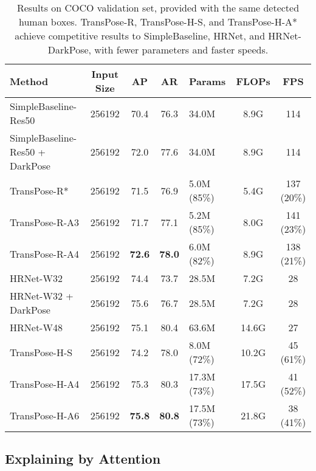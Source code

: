 \documentclass{article}
\begin{document}
\begin{table*}\small
 	\begin{center}
 		\setlength{\tabcolsep}{0.4mm}
 		\renewcommand{\arraystretch}{1.1}
 		\begin{tabular}{l|c|cc|l|c|c}
 			\toprule
 			Method &Input Size &AP &AR &Params &FLOPs & FPS \\
 			\midrule
 			SimpleBaseline-Res50~\cite{xiao2018simple} &256192 &70.4& 76.3 &34.0M &8.9G & 114\\
 			SimpleBaseline-Res50 + DarkPose &256192 &72.0& 77.6 &34.0M &8.9G & 114\\
 			\hline
 			TransPose-R* & 256192 & 71.5 & 76.9& 5.0M ({\color{black}85\%}) &5.4G & 137 ({\color{black}20\%})\\
 			TransPose-R-A3 & 256192 & 71.7 & 77.1& 5.2M ({\color{black}85\%}) &8.0G & 141 ({\color{black}23\%})\\
 			TransPose-R-A4 & 256192 & \textbf{72.6} & \textbf{78.0}& 6.0M ({\color{black}82\%}) &8.9G & 138 ({\color{black}21\%})\\
 			\midrule
 			HRNet-W32~\cite{sun2019hrnet} &256192 &74.4& 73.7 &28.5M &7.2G & 28\\
 			HRNet-W32 + DarkPose~\cite{zhang2020distribution} &256192 &75.6& 76.7 &28.5M &7.2G & 28\\
 			HRNet-W48~\cite{sun2019hrnet} &256192 &75.1& 80.4 &63.6M &14.6G & 27\\
 			\hline
 			TransPose-H-S &256192 & 74.2 & 78.0& 8.0M ({\color{black}72\%})& 10.2G & 45 ({\color{black}61\%})\\
TransPose-H-A4 &256192 & 75.3 & 80.3& 17.3M ({\color{black}73\%})& 17.5G & 41 ({\color{black}52\%})\\
TransPose-H-A6 &256192 & \textbf{75.8} & \textbf{80.8}& 17.5M ({\color{black}73\%})& 21.8G & 38 ({\color{black}41\%})\\
 			\bottomrule
 		\end{tabular}
 	\end{center}
 	\caption{Results on COCO validation set, provided with the same detected human boxes. TransPose-R, TransPose-H-S, and TransPose-H-A* achieve competitive results to SimpleBaseline, HRNet, and HRNet-DarkPose, with fewer parameters and faster speeds.}\vspace*{-0.1in}
 	\label{state-of-the-art}
\end{table*}

\subsection{Explaining by Attention}
\end{document}
